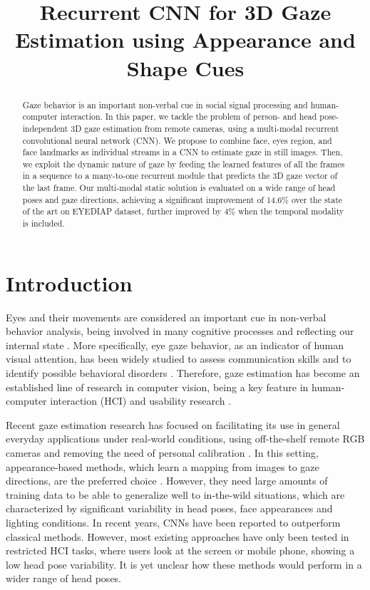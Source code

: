 \documentclass{bmvc2k}
\title{Recurrent CNN for 3D Gaze Estimation using Appearance and Shape Cues}
\begin{document}
\maketitle

\begin{abstract}
	
	Gaze behavior is an important non-verbal cue in social signal processing and human-computer interaction. In this paper, we tackle the problem of person- and head pose-independent 3D gaze estimation from remote cameras, using a multi-modal recurrent convolutional neural network (CNN). We propose to combine face, eyes region, and face landmarks as individual streams in a CNN to estimate gaze in still images. Then, we exploit the dynamic nature of gaze by feeding the learned features of all the frames in a sequence to a many-to-one recurrent module that predicts the 3D gaze vector of the last frame. Our multi-modal static solution is evaluated on a wide range of head poses and gaze directions, achieving a significant improvement of 14.6\% over the state of the art on EYEDIAP dataset, further improved by 4\% when the temporal modality is included.
	
\end{abstract}


\section{Introduction}
\label{sec:intro}
\vspace{-0.2cm}	
Eyes and their movements are considered an important cue in non-verbal behavior analysis, being involved in many cognitive processes and reflecting our internal state \cite{liversedge2000saccadic}. More specifically, eye gaze behavior, as an indicator of human visual attention, has been widely studied to assess communication skills \cite{rutter1987turn} and to identify possible behavioral disorders \cite{guillon2014visual}. Therefore, gaze estimation has become an established line of research in computer vision, being a key feature in human-computer interaction (HCI) and usability research \cite{jacob2003eye, majaranta2014eye}. 

Recent gaze estimation research has focused on facilitating its use in general everyday applications under real-world conditions, using off-the-shelf remote RGB cameras and removing the need of personal calibration \cite{palmero2018mutual}. In this setting, appearance-based methods, which learn a mapping from images to gaze directions, are the preferred choice \cite{ono2006gaze}. However, they need large amounts of training data to be able to generalize well to in-the-wild situations, which are characterized by significant variability in head poses, face appearances and lighting conditions. In recent years, CNNs have been reported to outperform classical methods. However, most existing approaches have only been tested in restricted HCI tasks, where users look at the screen or mobile phone, showing a low head pose variability. It is yet unclear how these methods would perform in a wider range of head poses. 
\end{document}
